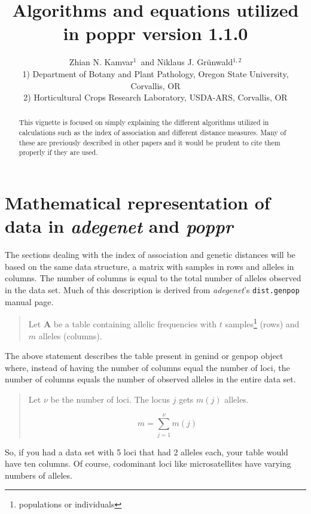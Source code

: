 \documentclass[letterpaper]{article}\usepackage[]{graphicx}\usepackage[]{color}
\title{Algorithms and equations utilized in poppr version 1.1.0}
\author{Zhian N. Kamvar$^{1}$\ and Niklaus J. Gr\"unwald$^{1,2}$\\\scriptsize{1)
Department of Botany and Plant Pathology, Oregon State University, Corvallis,
OR}\\\scriptsize{2) Horticultural Crops Research Laboratory, USDA-ARS,
Corvallis, OR}}
\newcommand{\poppr}{\textit{poppr}}
\newcommand{\adegenet}{\textit{adegenet}}
\begin{document}
\maketitle

\begin{abstract}
This vignette is focused on simply explaining the different algorithms utilized
in calculations such as the index of association and different distance measures.
Many of these are previously described in other papers and it would be prudent
to cite them properly if they are used.
\end{abstract}

% 
\begingroup
  \hypersetup{linkcolor=black} 
  \tableofcontents 
\endgroup 

\section{Mathematical representation of data in \adegenet{} and \poppr{}}

The sections dealing with the index of association and genetic distances will be
based on the same data structure, a matrix with samples in rows and alleles in
columns. The number of columns is equal to the total number of alleles observed
in the data set. Much of this description is derived from \adegenet{}'s
\texttt{dist.genpop} manual page.

\begin{quote}
Let \textbf{A} be a table containing allelic frequencies with $t$
samples\footnote{populations or individuals} (rows) and $m$ alleles (columns).\\
\end{quote}
The above statement describes the table present in genind or genpop object
where, instead of having the number of columns equal the number of loci, the
number of columns equals the number of observed alleles in the entire data set.

\begin{quote}
Let $\nu$ be the number of loci. The locus $j$ gets $m(j)$ alleles. 

\begin{equation}
  m=\sum_{j=1}^{\nu} m(j)
\end{equation}
\end{quote}

So, if you had a data set with 5 loci that had 2 alleles each, your table
would have ten columns. Of course, codominant loci like microsatellites have
varying numbers of alleles.
\end{document}
